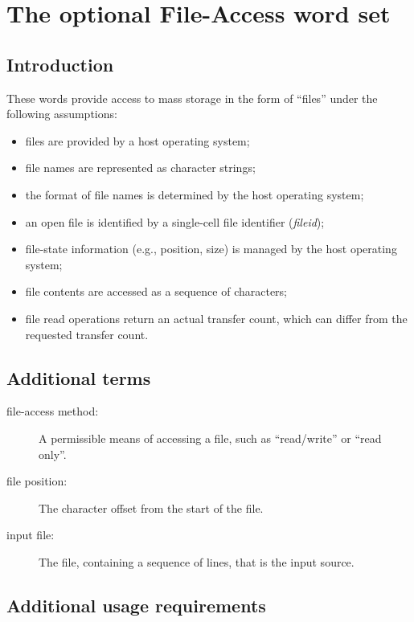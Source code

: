 \chapter{The optional File-Access word set} %

\section{Introduction} %

These words provide access to mass storage in the form of ``files''
under the following assumptions:

\begin{itemize}
\item files are provided by a host operating system;
\item file names are represented as character strings;
\item the format of file names is determined by the host operating
	system;
\item an open file is identified by a single-cell file identifier
	(\emph{fileid});
\item file-state information (e.g., position, size) is managed by
	the host operating system;
\item file contents are accessed as a sequence of characters;
\item file read operations return an actual transfer count, which
	can differ from the requested transfer count.
\end{itemize}

\section{Additional terms} %

\begin{description}
\item[file-access method:]
	A permissible means of accessing a file, such as ``read/write''
	or ``read only''.

\item[file position:]
	The character offset from the start of the file.

\item[input file:]
	The file, containing a sequence of lines, that is the input source.
\end{description}

\section{Additional usage requirements} %

